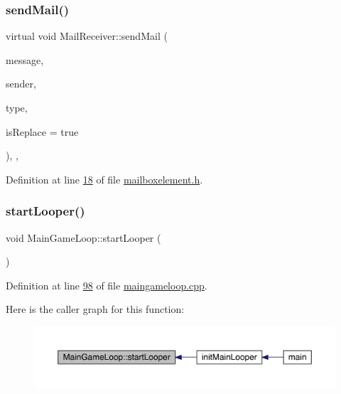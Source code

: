 \subsubsection{\texorpdfstring{send\+Mail()}{sendMail()}}
{\footnotesize\ttfamily virtual void Mail\+Receiver\+::send\+Mail (\begin{DoxyParamCaption}\item[{\hyperlink{a00121}{Message\+For\+Server} $\ast$}]{message,  }\item[{\hyperlink{a00205}{Mail\+Sender} $\ast$}]{sender,  }\item[{int}]{type,  }\item[{bool}]{is\+Replace = {\ttfamily true} }\end{DoxyParamCaption})\hspace{0.3cm}{\ttfamily [inline]}, {\ttfamily [virtual]}, {\ttfamily [inherited]}}



Definition at line \hyperlink{a00002_source_l00018}{18} of file \hyperlink{a00002_source}{mailboxelement.\+h}.

\mbox{\label{a00209_a2329f4e9c9a4ad9ecbed39d5c297245f}} 
\subsubsection{\texorpdfstring{start\+Looper()}{startLooper()}}
{\footnotesize\ttfamily void Main\+Game\+Loop\+::start\+Looper (\begin{DoxyParamCaption}{ }\end{DoxyParamCaption})}



Definition at line \hyperlink{a00089_source_l00098}{98} of file \hyperlink{a00089_source}{maingameloop.\+cpp}.

Here is the caller graph for this function\+:
\nopagebreak
\begin{figure}[H]
\begin{center}
\leavevmode
\includegraphics[width=350pt]{d3/de5/a00209_a2329f4e9c9a4ad9ecbed39d5c297245f_icgraph}
\end{center}
\end{figure}


